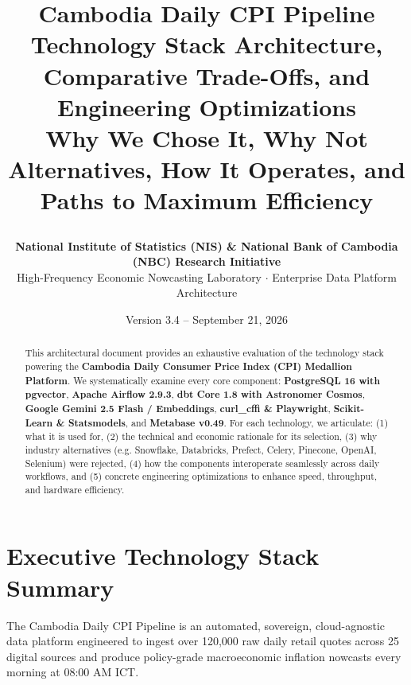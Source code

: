 \documentclass[a4paper, 11pt]{article}
\title{\vspace{-1.2cm}
\begin{tcolorbox}[colback=primaryblue, colframe=primaryblue, arc=2mm]
\centering \color{white}
{\Huge \textbf{Cambodia Daily CPI Pipeline}}\\[6pt]
{\Large Technology Stack Architecture, Comparative Trade-Offs, and Engineering Optimizations}\\[4pt]
{\large Why We Chose It, Why Not Alternatives, How It Operates, and Paths to Maximum Efficiency}
\end{tcolorbox}
\vspace{-0.5cm}}
\author{\textbf{National Institute of Statistics (NIS) \& National Bank of Cambodia (NBC) Research Initiative}\\[2pt]
\small High-Frequency Economic Nowcasting Laboratory $\cdot$ Enterprise Data Platform Architecture}
\date{\small Version 3.4 -- September 21, 2026}
\begin{document}
\maketitle

\begin{abstract}
\noindent This architectural document provides an exhaustive evaluation of the technology stack powering the \textbf{Cambodia Daily Consumer Price Index (CPI) Medallion Platform}. We systematically examine every core component: \textbf{PostgreSQL 16 with pgvector}, \textbf{Apache Airflow 2.9.3}, \textbf{dbt Core 1.8 with Astronomer Cosmos}, \textbf{Google Gemini 2.5 Flash / Embeddings}, \textbf{curl\_cffi \& Playwright}, \textbf{Scikit-Learn \& Statsmodels}, and \textbf{Metabase v0.49}. For each technology, we articulate: (1) what it is used for, (2) the technical and economic rationale for its selection, (3) why industry alternatives (e.g. Snowflake, Databricks, Prefect, Celery, Pinecone, OpenAI, Selenium) were rejected, (4) how the components interoperate seamlessly across daily workflows, and (5) concrete engineering optimizations to enhance speed, throughput, and hardware efficiency.
\end{abstract}

\vspace{0.3cm}
\tableofcontents
\newpage

\section{Executive Technology Stack Summary}

The Cambodia Daily CPI Pipeline is an automated, sovereign, cloud-agnostic data platform engineered to ingest over 120,000 raw daily retail quotes across 25 digital sources and produce policy-grade macroeconomic inflation nowcasts every morning at 08:00 AM ICT.
\end{document}
